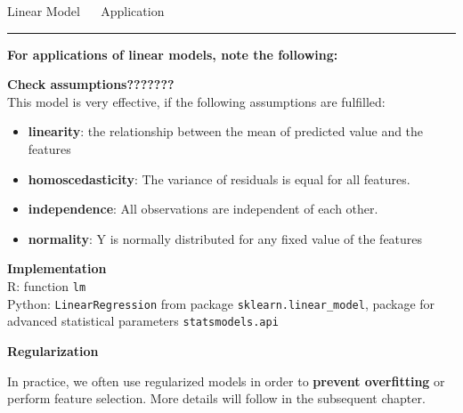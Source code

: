 \documentclass[11pt,compress,t,notes=noshow, xcolor=table]{beamer}
\begin{document}

\LARGE
\begin{frame}{\textcolor{gray!80}{Linear Model} ~~ Application}
\normalsize
\vspace{-0.5cm}
\noindent \textcolor{gray!80}{\rule{\textwidth}{1pt}}

\vspace{0.3cm}

\footnotesize

\textbf{For applications of linear models, note the following:}
\lz


 \textbf{\textcolor{gray!80}{Check assumptions???????}} \\
 This model is very effective, if the following assumptions are fulfilled:
 \begin{itemize}\footnotesize
  \item \textbf{linearity}: the relationship between the mean of predicted value and the features
  \item \textbf{homoscedasticity}: The variance of residuals is equal for all features.
  \item \textbf{independence}: All observations are independent of each other.
  \item \textbf{normality}: Y is normally distributed for any fixed value of the features
\end{itemize}

\lz

  \textbf{\textcolor{gray!80}{Implementation}} \\
  \smallskip
  R: function \texttt{lm}\\
  Python: \texttt{LinearRegression} from package \texttt{sklearn.linear\_model}, package for advanced statistical parameters \texttt{statsmodels.api} 

\lz

 \textbf{\textcolor{gray!80}{Regularization}} \\
 \smallskip
 
 In practice, we often use regularized models in order to \textbf{prevent overfitting} or perform feature selection. More details will follow in the subsequent chapter. 


\end{frame}




% 
% 
\end{document}
